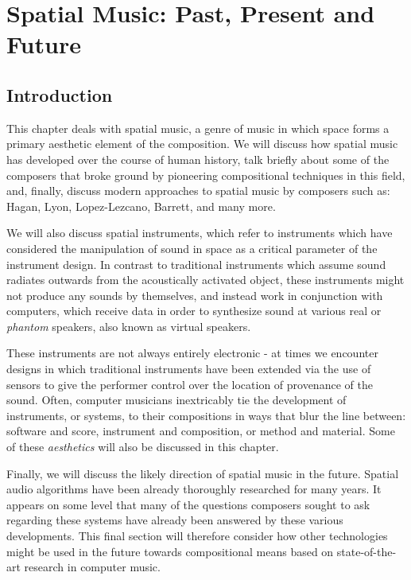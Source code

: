 \chapter{Spatial Music: Past, Present and Future} \label{ch:spat-mus} 

\section{Introduction}

This chapter deals with spatial music, a genre of music in which space forms a primary aesthetic element of the composition. We will discuss how spatial music has developed over the course of human history, talk briefly about some of the composers that broke ground by pioneering compositional techniques in this field, and, finally, discuss modern approaches to spatial music by composers such as: Hagan, Lyon, Lopez-Lezcano, Barrett, and many more. 

We will also discuss spatial instruments, which refer to instruments which have considered the manipulation of sound in space as a critical parameter of the instrument design. In contrast to traditional instruments which assume sound radiates outwards from the acoustically activated object, these instruments might not produce any sounds by themselves, and instead work in conjunction with computers, which receive data in order to synthesize sound at various real or \textit{phantom} speakers, also known as virtual speakers. 

These instruments are not always entirely electronic - at times we encounter designs in which traditional instruments have been extended via the use of sensors to give the performer control over the location of provenance of the sound. Often, computer musicians inextricably tie the development of instruments, or systems, to their compositions in ways that blur the line between: software and score, instrument and composition, or method and material. Some of these \textit{aesthetics} will also be discussed in this chapter. 

Finally, we will discuss the likely direction of spatial music in the future. Spatial audio algorithms have been already thoroughly researched for many years. It appears on some level that many of the questions composers sought to ask regarding these systems have already been answered by these various developments. This final section will therefore consider how other technologies might be used in the future towards compositional means based on state-of-the-art research in computer music. 

